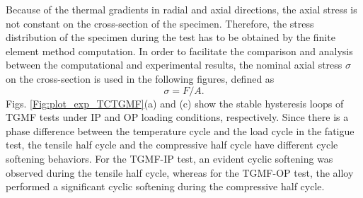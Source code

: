 \documentclass[preprint,5p,twocolumn,10pt,sort&compress]{elsarticle}
\begin{document}
Because of the thermal gradients in radial and axial directions, the axial stress is not constant on the cross-section of the specimen.
Therefore, the stress distribution of the specimen during the test has to be obtained by the finite element method computation.
In order to facilitate the comparison and analysis between the computational and experimental results, the nominal axial stress $\sigma$ on the cross-section is used in the following figures, defined as
\begin{equation}
\sigma = F/A.
\end{equation}
Figs. \ref{Fig:plot_exp_TCTGMF}(a) and (c) show the stable hysteresis loops of TGMF tests under IP and OP loading conditions, respectively.
Since there is a phase difference between the temperature cycle and the load cycle in the fatigue test, the tensile half cycle and the compressive half cycle have different cycle softening behaviors.
For the TGMF-IP test, an evident cyclic softening was observed during the tensile half cycle, whereas for the TGMF-OP test, the alloy performed a significant cyclic softening during the compressive half cycle.
\end{document}
